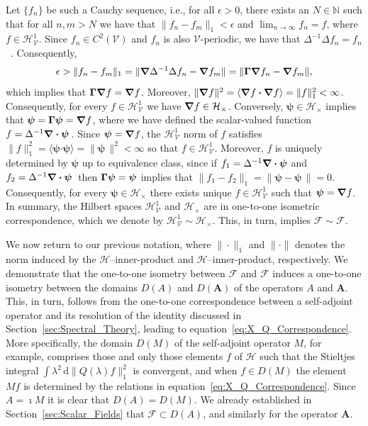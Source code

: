 \documentclass[leqno,onefignum,onetabnum]{siamltex1213}
\newcommand{\secref}[1]{Section~\ref{#1}}
\renewcommand{\d}{\mathrm{d}}
\newcommand{\Ab}{\mathbf{A}}
\newcommand{\Vc}{\mathcal{V}}
\newcommand{\Hc}{\mathcal{H}}
\newcommand{\Fc}{\mathcal{F}}
\newcommand{\Hs}{\mathscr{H}}
\newcommand{\Fs}{\mathscr{F}}
\newcommand\bGamma{\mbox{\boldmath${\Gamma}$}}
\newcommand\bnabla{\mbox{\boldmath${\nabla}$}}
\providecommand\bcdot{\boldsymbol{\cdot}}
\newcommand{\vecpsi}{\boldsymbol{\psi}}
\begin{document}
Let $\{f_n\}$ be such a Cauchy sequence, i.e., for all $\epsilon>0$, there
exists an $N\in\mathbb{N}$ such that for all $n,m>N$ we have that
$\|f_n-f_m\|_1<\epsilon$ and $\lim_{n\to\infty}f_n=f$, where $f\in\Hs^1_{\Vc}$. Since
$f_n\in C^2(\Vc)$ and $f_n$ is also $\Vc$-periodic, we have that $\Delta^{-1}\Delta
f_n=f_n$~\cite{McOwen:2003:PDE}. Consequently,  
%
\begin{align}
  \epsilon>\|f_n-f_m\|_1
   =\|\bnabla \Delta^{-1}\Delta f_n-\bnabla f_m\|
   =\|\bGamma\bnabla f_n-\bnabla f_m\|,
\end{align}
%
which implies that $\bGamma\bnabla f=\bnabla f$. Moreover, $\|\bnabla
f\|^2=\langle\bnabla f\bcdot\bnabla f\rangle=\|f\|_1^2<\infty$. Consequently, for every   
$f\in\Hs^1_{\Vc}$ we have $\bnabla f\in\Hc_\times$. Conversely,
$\vecpsi\in\Hc_\times$ implies that $\vecpsi=\bGamma\vecpsi=\bnabla f$, where
we have defined the scalar-valued function
$f=\Delta^{-1}\bnabla \bcdot\vecpsi\,$. Since $\vecpsi=\bnabla f$, the
$\Hs^1_{\Vc}$ norm of $f$ satisfies
$\|f\|_1^2=\langle\vecpsi\bcdot\vecpsi\rangle=\|\vecpsi\,\|^2<\infty$ so that
$f\in\Hs^1_{\Vc}$. Moreover, $f$ is uniquely determined by $\vecpsi$ up
to equivalence class, since if $f_1=\Delta^{-1}\bnabla \bcdot\vecpsi$ and
$f_2=\Delta^{-1}\bnabla \bcdot\vecpsi\,$ then $\bGamma\vecpsi=\vecpsi$ implies
that $\|f_1-f_2\|_1=\|\vecpsi-\vecpsi\,\|=0$. Consequently, for every  
$\vecpsi\in\Hc_\times$ there exists unique $f\in\Hs^1_{\Vc}$ such that
$\vecpsi=\bnabla f$.  In summary, the Hilbert spaces $\Hs^1_{\Vc}$ and
$\Hc_\times$ are in one-to-one isometric correspondence, which we denote by
$\Hs^1_{\Vc}\sim\Hc_\times$. This, in turn, implies  $\Fs\sim\Fc$.  



We now return to our previous notation, where $\|\cdot\|_1$ and $\|\cdot\|$
denotes the norm induced by the $\Hs$--inner-product and
$\Hc$--inner-product, respectively. We demonstrate that the one-to-one
isometry between $\Fs$ and $\Fc$ induces a one-to-one isometry between
the domains $D(A)$ and $D(\Ab)$ of the operators $A$ and $\Ab$. This,
in turn, follows from the one-to-one 
correspondence between a self-adjoint operator and its resolution of
the identity discussed in \secref{sec:Spectral_Theory}, leading to
equation~\eqref{eq:X_Q_Correspondence}. More specifically, the domain
$D(M)$ of the self-adjoint operator $M$, for example, comprises those
and only those elements $f$ of $\Hs$ such that the Stieltjes integral
$\int\lambda^2\,\d\|Q(\lambda)f\|_1^2$ is convergent, and when $f\in D(M)$ the element $Mf$
is determined by the relations in
equation~\eqref{eq:X_Q_Correspondence}. Since $A=\imath M$ it is clear that
$D(A)=D(M)$. We already established in
\secref{sec:Scalar_Fields} that $\Fs\subset D(A)$, and similarly for the
operator $\Ab$.
\end{document}
